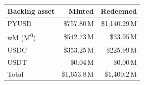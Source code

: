 \begin{tabular}{@{}lrr@{}}
\toprule
Backing asset & Minted & Redeemed \\
\midrule
PYUSD & \$757.80\,M & \$1,140.29\,M \\
wM (M\textsuperscript{0}) & \$542.73\,M & \$33.95\,M \\
USDC & \$353.25\,M & \$225.99\,M \\
USDT & \$0.04\,M & \$0.00\,M \\
\midrule
Total & \$1,653.8\,M & \$1,400.2\,M \\
\bottomrule
\end{tabular}
